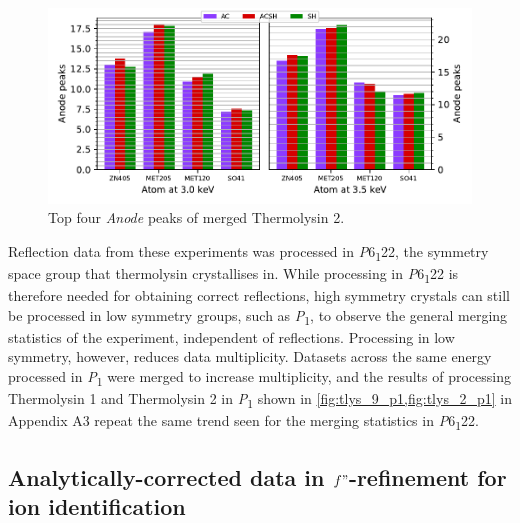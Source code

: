 \begin{figure}[h]
    \centering
    \includegraphics[width = 0.8 \textwidth]{plots/exp1/tlys_2_P6122/peaks/merged_peaks.pdf}
    \caption{Top four \textit{Anode} peaks of merged Thermolysin 2.}
    \label{fig:tlys_2_merged_peaks}
\end{figure}


Reflection data from these experiments was processed in \textit{P}6\textsubscript{1}22, the symmetry space group that thermolysin crystallises in. While processing in \textit{P}6\textsubscript{1}22 is therefore needed for obtaining correct reflections, high symmetry crystals can still be processed in low symmetry groups, such as \textit{P}\textsubscript{1}, to observe the general merging statistics of the experiment, independent of reflections.
Processing in low symmetry, however, reduces data multiplicity. Datasets across the same energy processed in \textit{P}\textsubscript{1} were merged to increase multiplicity, and the results of processing Thermolysin 1 and Thermolysin 2 in \textit{P}\textsubscript{1} shown in \cref{fig:tlys_9_p1,fig:tlys_2_p1} in Appendix A3 repeat the same trend seen for the merging statistics in \textit{P}6\textsubscript{1}22.

\subsection{Analytically-corrected data in $f"$-refinement for ion identification}


